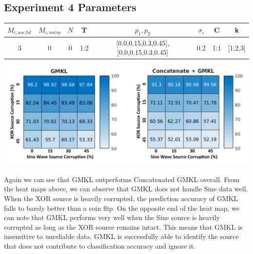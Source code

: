 \documentclass{article}
\begin{document}
\subsection*{Experiment 4 Parameters}
\begin{center}
\begin{tabular}{|c|c|c|c|c|c|c|c|}
\hline
$M_{i,useful}$ & $M_{i, noisy}$ & $N$ & T &  $p_1, p_2$ & $\sigma_i$ & C &  k  \\
\hline
3 & 0 & 0 & 1:2 & [0.0,0.15,0.3,0.45],[0.0,0.15,0.3,0.45] & 0.2 & 1:1 & [1,2,3]  \\
\hline
\end{tabular}
\end{center}


\begin{minipage}{\textwidth}
    \centering
    \includegraphics[width=\textwidth]{SineXORCorrupt.png}
    \label{fig:sinexor_heatmaps}
\end{minipage}


Again we can see that GMKL outperforms Concatenated GMKL overall. From the heat
maps above, we can observe that GMKL does not handle Sine data well. When the
XOR source is heavily corrupted, the prediction accuracy of GMKL falls to
barely better than a coin flip. On the opposite end of the heat map, we can
note that GMKL performs very well when the Sine source is heavily corrupted as
long as the XOR source remains intact. This means that GMKL is insensitive to
unreliable data. GMKL is successfully able to identify the source that does not
contribute to classification accuracy and ignore it.
\end{document}
